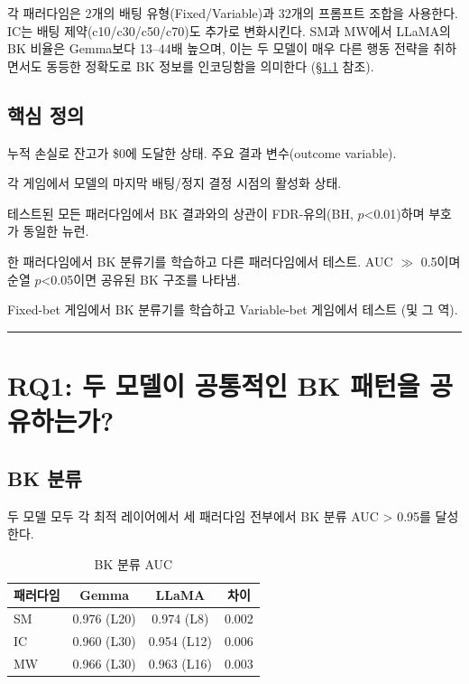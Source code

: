 \documentclass[11pt,a4paper]{article}
\begin{document}
각 패러다임은 2개의 배팅 유형(Fixed/Variable)과 32개의 프롬프트 조합을 사용한다. IC는 배팅 제약(c10/c30/c50/c70)도 추가로 변화시킨다. SM과 MW에서 LLaMA의 BK 비율은 Gemma보다 13--44배 높으며, 이는 두 모델이 매우 다른 행동 전략을 취하면서도 동등한 정확도로 BK 정보를 인코딩함을 의미한다 (\S\ref{sec:rq1_classification_ko} 참조).

\subsection{핵심 정의}

\begin{description}[style=nextline, leftmargin=2em]
    \item[파산 (Bankruptcy, BK)] 누적 손실로 잔고가 \$0에 도달한 상태. 주요 결과 변수(outcome variable).
    \item[의사결정 지점 (Decision Point, DP)] 각 게임에서 모델의 마지막 배팅/정지 결정 시점의 활성화 상태.
    \item[보편 BK 뉴런 (Universal BK neuron)] 테스트된 모든 패러다임에서 BK 결과와의 상관이 FDR-유의(BH, $p$<0.01)하며 부호가 동일한 뉴런.
    \item[교차 도메인 전이 (Cross-domain transfer)] 한 패러다임에서 BK 분류기를 학습하고 다른 패러다임에서 테스트. AUC $\gg$ 0.5이며 순열 $p$<0.05이면 공유된 BK 구조를 나타냄.
    \item[교차 배팅 유형 전이 (Cross-bet-type transfer, F1)] Fixed-bet 게임에서 BK 분류기를 학습하고 Variable-bet 게임에서 테스트 (및 그 역).
\end{description}

\bigskip\hrule\bigskip

\section{RQ1: 두 모델이 공통적인 BK 패턴을 공유하는가?}

\subsection{BK 분류}\label{sec:rq1_classification_ko}

두 모델 모두 각 최적 레이어에서 세 패러다임 전부에서 BK 분류 AUC > 0.95를 달성한다.

\begin{table}[H]
\centering
\caption{BK 분류 AUC}
\begin{tabular}{lccc}
\toprule
\textbf{패러다임} & \textbf{Gemma} & \textbf{LLaMA} & \textbf{차이} \\
\midrule
SM & 0.976 (L20) & 0.974 (L8) & 0.002 \\
IC & 0.960 (L30) & 0.954 (L12) & 0.006 \\
MW & 0.966 (L30) & 0.963 (L16) & 0.003 \\
\bottomrule
\end{tabular}
\end{table}
\end{document}
